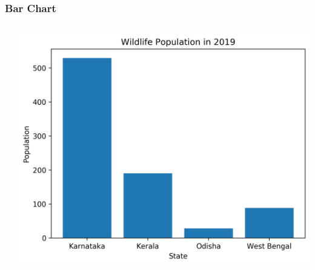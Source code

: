 \documentclass[xcolor={svgnames}]{beamer}
\newcommand{\pyfile}[2][]{}
\begin{document}
\begin{frame}[t,fragile]
    \frametitle{Bar Chart}
    \vspace{-2mm}
    \begin{columns}[T]
        \begin{column}{0.54\textwidth}
            \pyfile[style=footnotesize]{examples/15-bar-simple.py}
        \end{column}
        \begin{column}{0.46\textwidth}
            \includegraphics[width=\textwidth]{img/15-bar-simple.png}
        \end{column}
    \end{columns}
\end{frame}
\end{document}

